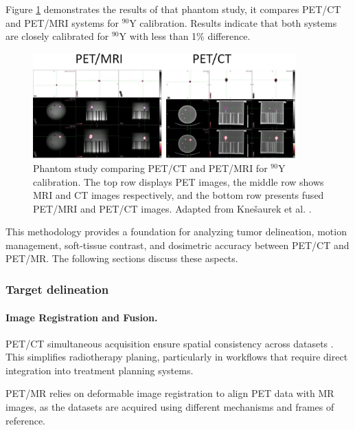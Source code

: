 
Figure \ref{fig:phantom_petct_petmri} demonstrates the results of that phantom study, it compares PET/CT and PET/MRI systems for $^{90}\text{Y}$ calibration. Results indicate that both systems are closely calibrated for \(^{90}\text{Y}\) with less than 1\% difference.

\begin{figure}[ht]
	\centering
	\includegraphics[width=0.9\textwidth]{assets/PETCT_vs_PETMRI_Phantom.png} %
	\caption{Phantom study comparing PET/CT and PET/MRI for \(^{90}\text{Y}\) calibration. The top row displays PET images, the middle row shows MRI and CT images respectively, and the bottom row presents fused PET/MRI and PET/CT images.  Adapted from Knešaurek et al. \cite{knesaurek2018}.}
	\label{fig:phantom_petct_petmri}
\end{figure}

This methodology provides a foundation for analyzing tumor delineation, motion management, soft-tissue contrast, and dosimetric accuracy between PET/CT and PET/MR. The following sections discuss these aspects.

\subsubsection*{Target delineation}

\paragraph{Image Registration and Fusion.} 

PET/CT simultaneous acquisition ensure spatial consistency across datasets \cite{TG132}. This simplifies radiotherapy planing, particularly in workflows that require direct integration into treatment planning systems. 

PET/MR relies on deformable image registration to align PET data with MR images, as the datasets are acquired using different mechanisms and frames of reference. %

